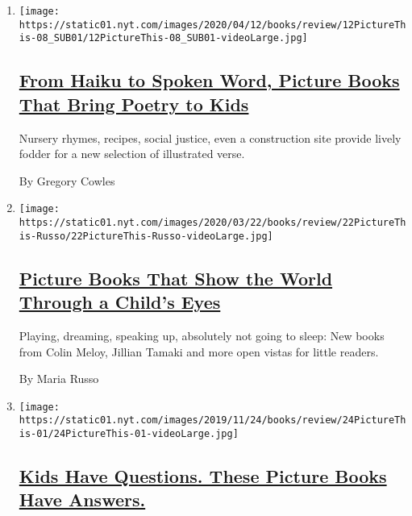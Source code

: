 \begin{enumerate}
\def\labelenumi{\arabic{enumi}.}
\item
  \texttt{[image: https://static01.nyt.com/images/2020/04/12/books/review/12PictureThis-08\_SUB01/12PictureThis-08\_SUB01-videoLarge.jpg]}

  \hypertarget{from-haiku-to-spoken-word-picture-books-that-bring-poetry-to-kids}{%
  \subsection{\texorpdfstring{\href{/2020/04/10/books/review/picture-books-poetry.html}{From
  Haiku to Spoken Word, Picture Books That Bring Poetry to
  Kids}}{From Haiku to Spoken Word, Picture Books That Bring Poetry to Kids}}\label{from-haiku-to-spoken-word-picture-books-that-bring-poetry-to-kids}}

  Nursery rhymes, recipes, social justice, even a construction site
  provide lively fodder for a new selection of illustrated verse.

  By Gregory Cowles
\item
  \texttt{[image: https://static01.nyt.com/images/2020/03/22/books/review/22PictureThis-Russo/22PictureThis-Russo-videoLarge.jpg]}

  \hypertarget{picture-books-that-show-the-world-through-a-childs-eyes}{%
  \subsection{\texorpdfstring{\href{/2020/03/20/books/review/picture-books-colin-meloy-jillian-tamaki-serge-bloch.html}{Picture
  Books That Show the World Through a Child's
  Eyes}}{Picture Books That Show the World Through a Child's Eyes}}\label{picture-books-that-show-the-world-through-a-childs-eyes}}

  Playing, dreaming, speaking up, absolutely not going to sleep: New
  books from Colin Meloy, Jillian Tamaki and more open vistas for little
  readers.

  By Maria Russo
\item
  \texttt{[image: https://static01.nyt.com/images/2019/11/24/books/review/24PictureThis-01/24PictureThis-01-videoLarge.jpg]}

  \hypertarget{kids-have-questions-these-picture-books-have-answers}{%
  \subsection{\texorpdfstring{\href{/2019/11/22/books/review/isabelle-arsenault-grant-snider-little-libraries-picture-books.html}{Kids
  Have Questions. These Picture Books Have
  Answers.}}{Kids Have Questions. These Picture Books Have Answers.}}\label{kids-have-questions-these-picture-books-have-answers}}


\end{enumerate}

